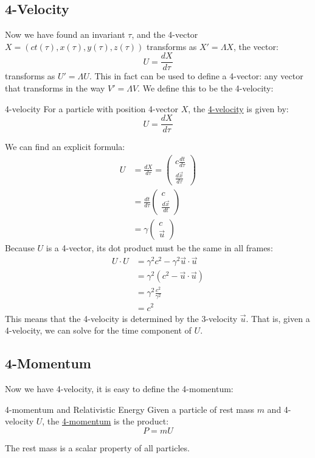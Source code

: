 \documentclass[../Main.tex]{subfiles}
\begin{document}
\subsection{4-Velocity}
Now we have found an invariant $\tau$, and the 4-vector $X = (ct(\tau), x(\tau), y(\tau), z(\tau))$ transforms as $X' = \Lambda X$, the vector:
\begin{equation*}
    U = \frac{dX}{d\tau}
\end{equation*}
transforms as $U' = \Lambda U$. This in fact can be used to define a 4-vector: any vector that transforms in the way $V' = \Lambda V$.
We define this to be the 4-velocity:
\begin{definition}{4-velocity}
    For a particle with position 4-vector $X$, the \underline{4-velocity} is given by:
    \begin{equation*}
        U = \frac{dX}{d\tau}
    \end{equation*}
\end{definition}
We can find an explicit formula:
\begin{align*}
    U &= \frac{dX}{d\tau} = \begin{pmatrix}c\frac{dt}{d\tau} \\ \frac{d\vec{x}}{d\tau}\end{pmatrix} \\
    &= \frac{dt}{d\tau} \begin{pmatrix}c \\ \frac{d\vec{x}}{dt}\end{pmatrix} \\
    &= \gamma \begin{pmatrix}c \\ \vec{u} \end{pmatrix}
\end{align*}
Because $U$ is a 4-vector, its dot product must be the same in all frames:
\begin{align*}
    U \cdot U &= \gamma^2 c^2 - \gamma^2 \vec{u} \cdot \vec{u} \\
    &= \gamma^2 (c^2 - \vec{u} \cdot \vec{u}) \\
    &= \gamma^2 \frac{c^2}{\gamma^2} \\
    &= c^2
\end{align*}
This means that the 4-velocity is determined by the 3-velocity $\vec{u}$. That is, given a 4-velocity, we can solve for the time component of $U$.
\subsection{4-Momentum}
Now we have 4-velocity, it is easy to define the 4-momentum:
\begin{definition}{4-momentum and Relativistic Energy}
    Given a particle of rest mass $m$ and 4-velocity $U$, the \underline{4-momentum} is the product:
    \begin{equation*}
        P = mU
    \end{equation*}
\end{definition}
The rest mass is a scalar property of all particles.
\end{document}
